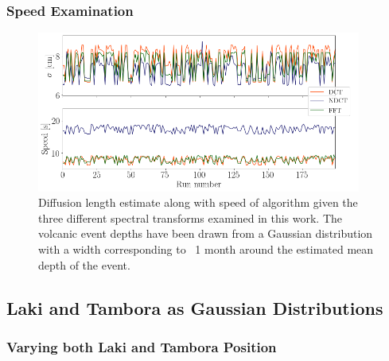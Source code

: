 \documentclass[../../CompleteThesis2/Complete_2ndDraft]{subfiles}
\begin{document}
\subsubsection{Speed Examination}
\label{Subsubsec:Method_TestStab_SpecTrans_Speed}

\begin{figure}[h]
	\centering
	\includegraphics[width=0.95\textwidth]{SiteA_SpecTrans_Speed.png}
	\caption[Speed and $\sigma$ Estimates, Spectral Transforms]{\small Diffusion length estimate along with speed of algorithm given the three different spectral transforms examined in this work. The volcanic event depths have been drawn from a Gaussian distribution with a width corresponding to ~1 month around the estimated mean depth of the event.}
	\label{fig:SiteA_SpecTrans_Speed}
\end{figure}




\subsection[LT locations]{Laki and Tambora as Gaussian Distributions}
\label{Subsec:Method_TestStab_LTlocations}



\subsubsection[Vary L and T]{Varying both Laki and Tambora Position}
\label{Subsubsec:Method_TestStab_LTlocations_LandT}
\end{document}
